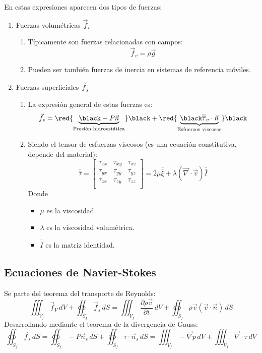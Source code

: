 En estas expresiones aparecen dos tipos de fuerzas:
\begin{enumerate}
	\item Fuerzas volumétricas $\vec{f}_v$
	\begin{enumerate}
		\item Típicamente son fuerzas relacionadas con campos:
		\[\vec{f}_v=\rho \vec{g}\]
		\item Pueden ser también fuerzas de inercia en sistemas de referencia móviles.
	\end{enumerate}
	\item Fuerzas superficiales $\vec{f}_s$
	
	\begin{enumerate}
		\item La expresión general de estas fuerzas es:
		\[\vec{f}_s=
		\red{\underbrace{\black -P\vec{n}}_{\text{Presión hidroestática}}}\black
		+
		\red{\underbrace{\black \overline{\overline{\tau}}_v\cdot\vec{n}}_{\text{Esfuerzos viscosos}}}\black
		\]
		\item Siendo el tensor de esfuerzas viscosos (es una ecuación constitutiva, depende del material):
		\[
		\overline{\overline{\tau}}=
		\begin{bmatrix}
			\tau_{xx} &\tau_{xy} & \tau_{xz} \\
			 \tau_{yx}&  \tau_{yy}& \tau_{yz}\\	
			\tau_{zx} & \tau_{zy} & \tau_{zz} \\
		\end{bmatrix}
		=2\mu \overline{\overline{\xi}} + \lambda \left(\vec{\nabla}\cdot \vec{v}\right)\overline{\overline{I}}
		\]
		Donde \begin{itemize}
			\item $\mu$ es la viscosidad.
			\item $\lambda$ es la viscosidad volumétrica.
			\item $\overline{\overline{I}}$ es la matriz identidad.
		\end{itemize}
	\end{enumerate}
\end{enumerate}
\subsection{Ecuaciones de Navier-Stokes}
Se parte del teorema del transporte de Reynolds:
\begin{equation}
\iiint_{V_f}\vec{f}_V\,dV
+
\oiint_{S_f}\vec{f}_s\,dS
=
\iiint_{V_f}\frac{\partial \rho\vec{v}}{\partial t}\,dV
+
\oiint_{S_f}\rho\vec{v}\left(\vec{v}\cdot\vec{n}\right)\,dS
\end{equation}
Desarrollando mediante el teorema de la divergencia de Gauss:
\begin{equation}
	\oiint_{S_f}\vec{f}_s\,dS
	=
	\oiint_{S_f}-P\vec{n}_s\,dS
	+
	\oiint_{S_f}\overline{\overline{\tau}}\cdot\vec{n}_s\,dS
	=
	\iiint_{V_f}-\vec{\nabla}p\,dV
	+
	\iiint_{V_f}\vec{\nabla}\cdot\overline{\overline{\tau}}\,dV
\end{equation}

